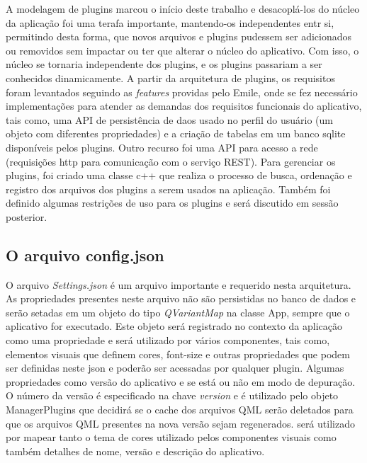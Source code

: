 A modelagem de plugins marcou o início deste trabalho e desacoplá-los do núcleo da aplicação foi uma terafa importante, mantendo-os independentes entr si, permitindo desta forma, que novos arquivos e plugins pudessem ser adicionados ou removidos sem impactar ou ter que alterar o núcleo do aplicativo. Com isso, o núcleo se tornaria independente dos plugins, e os plugins passariam a ser conhecidos dinamicamente. A partir da arquitetura de plugins, os requisitos foram levantados seguindo as \textit{features} providas pelo Emile, onde se fez necessário implementações para atender as demandas dos requisitos funcionais do aplicativo, tais como, uma API de persistência de daos usado no perfil do usuário (um objeto com diferentes propriedades) e a criação de tabelas em um banco sqlite disponíveis pelos plugins. Outro recurso foi uma API para acesso a rede (requisições http para comunicação com o serviço REST). Para gerenciar os plugins, foi criado uma classe c++ que realiza o processo de busca, ordenação e registro dos arquivos dos plugins a serem usados na aplicação. Também foi definido algumas restrições de uso para os plugins e será discutido em sessão posterior.


\subsection{O arquivo config.json}\label{sec:solucao-desenvolvida}
O arquivo \textit{Settings.json} é um arquivo importante e requerido nesta arquitetura. As propriedades presentes neste arquivo não são persistidas no banco de dados e serão setadas em um objeto do tipo \textit{QVariantMap} na classe App, sempre que o aplicativo for executado. Este objeto será registrado no contexto da aplicação como uma propriedade e será utilizado por vários componentes, tais como, elementos visuais que definem cores, font-size e outras propriedades que podem ser definidas neste json e poderão ser acessadas por qualquer plugin. Algumas propriedades como versão do aplicativo e se está ou não em modo de depuração. O número da versão é especificado na chave \textit{version} e é utilizado pelo objeto ManagerPlugins que decidirá se o cache dos arquivos QML serão deletados para que os arquivos QML presentes na nova versão sejam regenerados. será utilizado por mapear tanto o tema de cores utilizado pelos componentes visuais como também detalhes de nome, versão e descrição do aplicativo.


